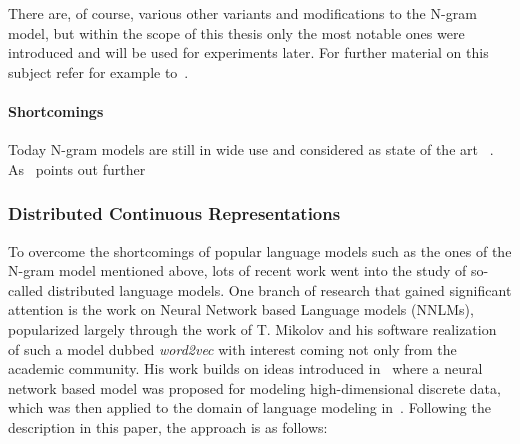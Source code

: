 There are, of course, various other variants and modifications to the N-gram model, but within the scope of this thesis only the most notable ones were introduced and will be used for experiments later. For further material on this subject refer for example to~\cite{Manning:2008aa}.


\paragraph{Shortcomings}
\label{subs:shortcomings-ngrams}

Today N-gram models are still in wide use and considered as state of the art ~\cite[p.~17]{Mikolov:2012aa}. As~\cite{Mikolov:2012aa} points out further ~\cite[p.~17]{Mikolov:2012aa}

\subsubsection{Distributed Continuous Representations}
\label{subs:Distributed Continuous Representations}

To overcome the shortcomings of popular language models such as the ones of the N-gram model mentioned above, lots of recent work went into the study of so-called distributed language models. One branch of research that gained significant attention is the work on Neural Network based Language models (NNLMs), popularized largely through the work of T. Mikolov and his software realization of such a model dubbed \emph{word2vec} with interest coming not only from the academic community. His work builds on ideas introduced in~\cite{Bengio:2000aa} where a neural network based model was proposed for modeling high-dimensional discrete data, which was then applied to the domain of language modeling in~\cite{bengio2003neural}. Following the description in this paper, the approach is as follows:

